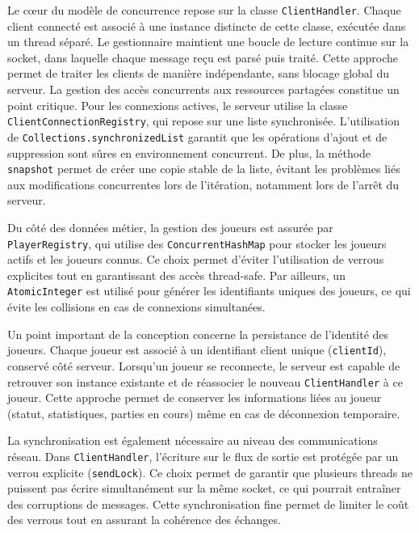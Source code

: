 \documentclass[a4paper]{article}
\begin{document}
Le cœur du modèle de concurrence repose sur la classe \texttt{ClientHandler}. Chaque client connecté est associé à une instance distincte de cette classe, exécutée dans un thread séparé. Le gestionnaire maintient une boucle de lecture continue sur la socket, dans laquelle chaque message reçu est parsé puis traité. Cette approche permet de traiter les clients de manière indépendante, sans blocage global du serveur. La gestion des accès concurrents aux ressources partagées constitue un point critique. Pour les connexions actives, le serveur utilise la classe \texttt{ClientConnectionRegistry}, qui repose sur une liste synchronisée. L’utilisation de \texttt{Collections.synchronizedList} garantit que les opérations d’ajout et de suppression sont sûres en environnement concurrent. De plus, la méthode \texttt{snapshot} permet de créer une copie stable de la liste, évitant les problèmes liés aux modifications concurrentes lors de l’itération, notamment lors de l’arrêt du serveur.

Du côté des données métier, la gestion des joueurs est assurée par \texttt{PlayerRegistry}, qui utilise des \texttt{ConcurrentHashMap} pour stocker les joueurs actifs et les joueurs connus. Ce choix permet d’éviter l’utilisation de verrous explicites tout en garantissant des accès thread-safe. Par ailleurs, un \texttt{AtomicInteger} est utilisé pour générer les identifiants uniques des joueurs, ce qui évite les collisions en cas de connexions simultanées. 

Un point important de la conception concerne la persistance de l’identité des joueurs. Chaque joueur est associé à un identifiant client unique (\texttt{clientId}), conservé côté serveur. Lorsqu’un joueur se reconnecte, le serveur est capable de retrouver son instance existante et de réassocier le nouveau \texttt{ClientHandler} à ce joueur. Cette approche permet de conserver les informations liées au joueur (statut, statistiques, parties en cours) même en cas de déconnexion temporaire. 

La synchronisation est également nécessaire au niveau des communications réseau. Dans \texttt{ClientHandler}, l’écriture sur le flux de sortie est protégée par un verrou explicite (\texttt{sendLock}). Ce choix permet de garantir que plusieurs threads ne puissent pas écrire simultanément sur la même socket, ce qui pourrait entraîner des corruptions de messages. Cette synchronisation fine permet de limiter le coût des verrous tout en assurant la cohérence des échanges. 
\end{document}
